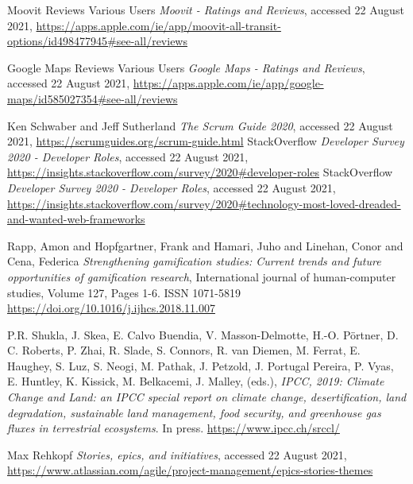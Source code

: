 \documentclass[]{UCD_CS_47360_Report}
\begin{document}
\begin{thebibliography}{99}
 Moovit Reviews Various Users \emph{Moovit - Ratings and Reviews}, accessed 22 August 2021, \href{https://apps.apple.com/ie/app/moovit-all-transit-options/id498477945#see-all/reviews}{https://apps.apple.com/ie/app/moovit-all-transit-options/id498477945\#see-all/reviews}

 Google Maps Reviews Various Users \emph{Google Maps - Ratings and Reviews}, accessed 22 August 2021, \href{https://apps.apple.com/ie/app/google-maps/id585027354#see-all/reviews}{https://apps.apple.com/ie/app/google-maps/id585027354\#see-all/reviews}

 Ken Schwaber and Jeff Sutherland \emph{The Scrum Guide 2020}, accessed 22 August 2021, \href{https://scrumguides.org/scrum-guide.html}{https://scrumguides.org/scrum-guide.html}
 StackOverflow \emph{Developer Survey 2020 - Developer Roles}, accessed 22 August 2021, \href{https://insights.stackoverflow.com/survey/2020#developer-roles}{https://insights.stackoverflow.com/survey/2020\#developer-roles}
 StackOverflow \emph{Developer Survey 2020 - Developer Roles}, accessed 22 August 2021, \href{https://insights.stackoverflow.com/survey/2020#technology-most-loved-dreaded-and-wanted-web-frameworks}{https://insights.stackoverflow.com/survey/2020\#technology-most-loved-dreaded-and-wanted-web-frameworks}

Rapp, Amon and Hopfgartner, Frank and Hamari, Juho and Linehan, Conor and Cena, Federica \emph{Strengthening gamification studies: Current trends and future opportunities of gamification research}, International journal of human-computer studies, Volume 127, Pages 1-6. ISSN 1071-5819 \href{https://doi.org/10.1016/j.ijhcs.2018.11.007}{https://doi.org/10.1016/j.ijhcs.2018.11.007}

P.R. Shukla, J. Skea, E. Calvo Buendia, V. Masson-Delmotte, H.-O. Pörtner, D. C. Roberts, P. Zhai, R. Slade, S. Connors, R. van Diemen, M. Ferrat, E. Haughey, S. Luz, S. Neogi, M. Pathak, J. Petzold, J. Portugal Pereira, P. Vyas, E. Huntley, K. Kissick, M. Belkacemi, J. Malley, (eds.), \emph{IPCC, 2019: Climate Change and Land: an IPCC special report on climate change, desertification, land degradation, sustainable land management, food security, and greenhouse gas fluxes in terrestrial ecosystems}. In press. \href{https://www.ipcc.ch/srccl/}{https://www.ipcc.ch/srccl/}

 Max Rehkopf \emph{Stories, epics, and initiatives}, accessed 22 August 2021, \href{https://www.atlassian.com/agile/project-management/epics-stories-themes}{https://www.atlassian.com/agile/project-management/epics-stories-themes}


\end{thebibliography}
\end{document}
